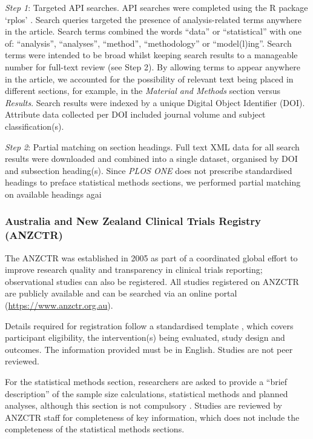 \documentclass[12pt]{article}
\begin{document}
\emph{Step 1}: Targeted API searches. API searches were completed using
the R package `rplos' \citep{rplos}. Search queries targeted the
presence of analysis-related terms anywhere in the article. Search terms
combined the words ``data'' or ``statistical'' with one of:
``analysis'', ``analyses'', ``method'', ``methodology'' or
``model(l)ing''. Search terms were intended to be broad whilst keeping
search results to a manageable number for full-text review (see Step 2).
By allowing terms to appear anywhere in the article, we accounted for
the possibility of relevant text being placed in different sections, for
example, in the \emph{Material and Methods} section versus
\emph{Results}. Search results were indexed by a unique Digital Object
Identifier (DOI). Attribute data collected per DOI included journal
volume and subject classification(s).

\emph{Step 2}: Partial matching on section headings. Full text XML data
for all search results were downloaded and combined into a single
dataset, organised by DOI and subsection heading(s). Since \emph{PLOS
ONE} does not prescribe standardised headings to preface statistical
methods sections, we performed partial matching on available headings
agai

\subsubsection{Australia and New Zealand Clinical Trials Registry (ANZCTR)}
\label{sec:methodsANZCTR}

The ANZCTR was established in 2005 as part of a coordinated global
effort to improve research quality and transparency in clinical trials
reporting; observational studies can also be registered. All studies
registered on ANZCTR are publicly available and can be searched via an
online portal (\url{https://www.anzctr.org.au}).

Details required for registration follow a standardised template
\citep{ANZCTR}, which covers participant eligibility, the
intervention(s) being evaluated, study design and outcomes. The
information provided must be in English. Studies are not peer reviewed.

For the statistical methods section, researchers are asked to provide a
``brief description'' of the sample size calculations, statistical
methods and planned analyses, although this section is not compulsory
\citep{ANZCTR}. Studies are reviewed by ANZCTR staff for completeness of
key information, which does not include the completeness of the
statistical methods sections.
\end{document}
